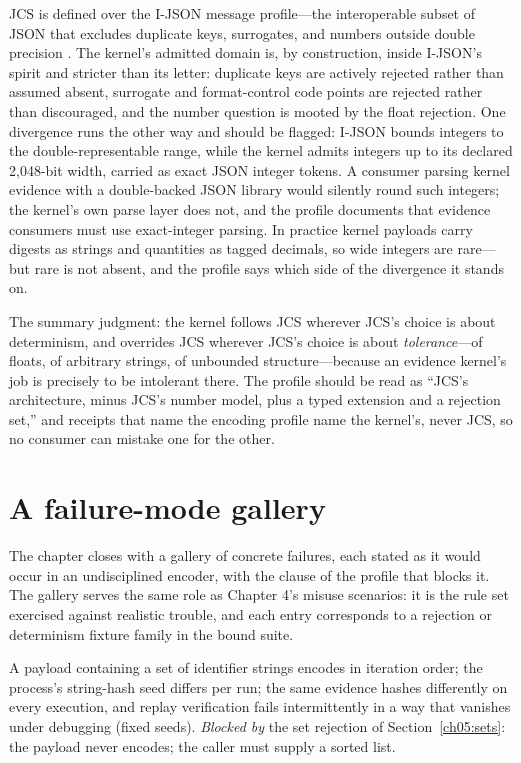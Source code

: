 \begin{remark}\label{ch05:rem:ijson}
JCS is defined over the I-JSON message profile---the interoperable
subset of JSON that excludes duplicate keys, surrogates, and numbers
outside double precision \cite{jcs}. The kernel's admitted domain is,
by construction, inside I-JSON's spirit and stricter than its letter:
duplicate keys are actively rejected rather than assumed absent,
surrogate and format-control code points are rejected rather than
discouraged, and the number question is mooted by the float rejection.
One divergence runs the other way and should be flagged: I-JSON bounds
integers to the double-representable range, while the kernel admits
integers up to its declared 2{,}048-bit width, carried as exact JSON
integer tokens. A consumer parsing kernel evidence with a
double-backed JSON library would silently round such integers; the
kernel's own parse layer does not, and the profile documents that
evidence consumers must use exact-integer parsing. In practice kernel
payloads carry digests as strings and quantities as tagged decimals,
so wide integers are rare---but rare is not absent, and the profile
says which side of the divergence it stands on.
\end{remark}

The summary judgment: the kernel follows JCS wherever JCS's choice is
about determinism, and overrides JCS wherever JCS's choice is about
\emph{tolerance}---of floats, of arbitrary strings, of unbounded
structure---because an evidence kernel's job is precisely to be
intolerant there. The profile should be read as ``JCS's architecture,
minus JCS's number model, plus a typed extension and a rejection set,''
and receipts that name the encoding profile name the kernel's, never
JCS, so no consumer can mistake one for the other.

\section{A failure-mode gallery}\label{ch05:gallery}

The chapter closes with a gallery of concrete failures, each stated as it
would occur in an undisciplined encoder, with the clause of the profile
that blocks it. The gallery serves the same role as Chapter 4's misuse
scenarios: it is the rule set exercised against realistic trouble, and
each entry corresponds to a rejection or determinism fixture family in
the bound suite.

\begin{example}\label{ch05:ex:seed}
A payload containing a set of identifier strings encodes in iteration
order; the process's string-hash seed differs per run; the same evidence
hashes differently on every execution, and replay verification fails
intermittently in a way that vanishes under debugging (fixed seeds).
\emph{Blocked by} the set rejection of Section~\ref{ch05:sets}: the
payload never encodes; the caller must supply a sorted list.
\end{example}

